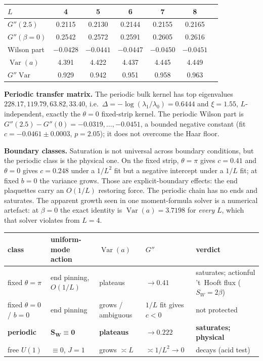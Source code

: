 \documentclass[11pt,a4paper]{article}
\begin{document}
\begin{center}\small
\begin{tabular}{@{}lcccccc@{}}
\toprule
$L$ & 4 & 5 & 6 & 7 & 8\\
\midrule
$G''(2.5)$ & 0.2115 & 0.2130 & 0.2144 & 0.2155 & 0.2165\\
$G''(\beta=0)$ & 0.2542 & 0.2572 & 0.2591 & 0.2605 & 0.2616\\
Wilson part & $-0.0428$ & $-0.0441$ & $-0.0447$ & $-0.0450$ & $-0.0451$\\
$\operatorname{Var}(a)$ & 4.391 & 4.422 & 4.437 & 4.445 & 4.449\\
$G''\operatorname{Var}$ & 0.929 & 0.942 & 0.951 & 0.958 & 0.963\\
\bottomrule
\end{tabular}
\end{center}

\textbf{Periodic transfer matrix.} The periodic bulk kernel has top eigenvalues
$228.17,119.79,63.82,33.40$, i.e.\ $\Delta=-\log(\lambda_1/\lambda_0)=0.6444$ and $\xi=1.55$,
$L$-independent, exactly the $\theta=0$ fixed-strip kernel. The periodic Wilson part is
$G''(2.5)-G''(0)=-0.0319,\dots,-0.0451$, a bounded negative constant (fit $c=-0.0461\pm0.0003$,
$p=2.05$); it does not overcome the Haar floor.

\textbf{Boundary classes.} Saturation is not universal across boundary conditions, but the periodic
class is the physical one. On the fixed strip, $\theta=\pi$ gives $c=0.41$ and $\theta=0$ gives
$c=0.248$ under a $1/L^2$ fit but a negative intercept under a $1/L$ fit; at fixed $b=0$ the variance
grows. Those are explicit-boundary effects: the end plaquettes carry an $O(1/L)$ restoring force. The
periodic chain has no ends and saturates. The apparent growth seen in one moment-formula solver is a
numerical artefact: at $\beta=0$ the exact identity is $\operatorname{Var}(a)=3.7198$ for \emph{every}
$L$, which that solver violates from $L=4$.

\begin{center}\small
\begin{tabular}{@{}p{2.5cm}p{3.4cm}p{2.6cm}p{2.2cm}p{3.2cm}@{}}
\toprule
class & uniform-mode action & $\operatorname{Var}(a)$ & $G''$ & verdict\\
\midrule
fixed $\theta=\pi$ & end pinning, $O(1/L)$ & plateaus & $\to0.41$ & saturates; actionful
't~Hooft flux ($S_W=2\beta$)\\
fixed $\theta=0$ / $b=0$ & end pinning & grows / ambiguous & $1/L$ fit gives $c<0$ & not protected\\
\textbf{periodic} & $\boldsymbol{S_W\equiv0}$ & \textbf{plateaus} & $\boldsymbol{\to0.222}$ &
\textbf{saturates; physical}\\
free $U(1)$ & $\equiv0$, $J=1$ & grows $\asymp L$ & $\asymp1/L^2\to0$ & decays (acid test)\\
\bottomrule
\end{tabular}
\end{center}
\end{document}
